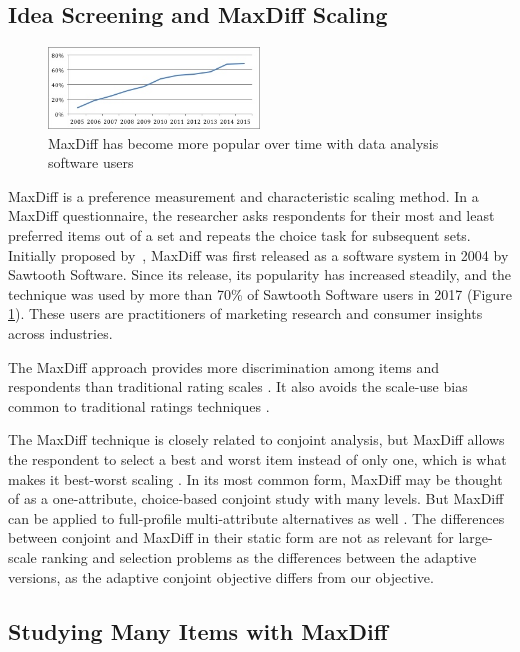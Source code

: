 \documentclass[nonblindrev]{informs3}
\begin{document}
\subsection{Idea Screening and MaxDiff Scaling}
\begin{figure}
\caption{MaxDiff has become more popular over time with data analysis software users} \label{fig:pop}
\begin{center}
\includegraphics[width=0.5\textwidth]{plots/maxdiffpop}
\end{center}
\end{figure}
MaxDiff is a preference measurement and characteristic scaling method. In a MaxDiff questionnaire, the researcher asks respondents for their most and least preferred items out of a set and repeats the choice task for subsequent sets. Initially proposed by~\cite{louviere1991best}, MaxDiff was first released as a software system in 2004 by Sawtooth Software. Since its release, its popularity has increased steadily, and the technique was used by more than 70\% of Sawtooth Software users in 2017 (Figure \ref{fig:pop}). These users are practitioners of marketing research and consumer insights across industries.

The MaxDiff approach provides more discrimination among items and respondents than traditional rating scales \citep{cohen2004s}. It also avoids the scale-use bias common to traditional ratings techniques \citep{marley2005some,chrzan2006empirical}.

The MaxDiff technique is closely related to conjoint analysis, but MaxDiff allows the respondent to select a best and worst item instead of only one, which is what makes it best-worst scaling \citep{marley2005some}. In its most common form, MaxDiff may be thought of as a one-attribute, choice-based conjoint study with many levels. But MaxDiff can be applied to full-profile multi-attribute alternatives as well \citep{marley2012models}. The differences between conjoint and MaxDiff in their static form are not as relevant for large-scale ranking and selection problems as the differences between the adaptive versions, as the adaptive conjoint objective differs from our objective.

\subsection{Studying Many Items with MaxDiff}
\end{document}
